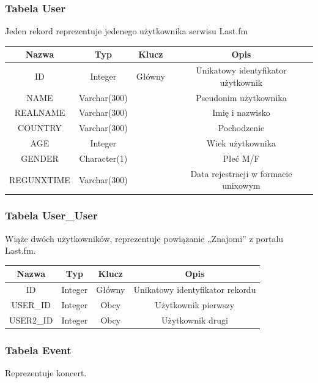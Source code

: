 \documentclass[10pt,a4paper,epic,carom]{article}
\begin{document}
\subsubsection{Tabela User}
Jeden rekord reprezentuje jedenego użytkownika serwisu Last.fm

\begin{table}[H]
  \centering
    \begin{tabular}{cccc}
    \addlinespace
    \toprule
    Nazwa & Typ   & Klucz & Opis \\
    \midrule
    ID    & Integer & Główny & Unikatowy identyfikator użytkownik \\
    NAME  & Varchar(300) &       & Pseudonim użytkownika \\
    REALNAME & Varchar(300) &       & Imię i nazwisko \\
    COUNTRY & Varchar(300) &       & Pochodzenie \\
    AGE   & Integer &       & Wiek użytkownika \\
    GENDER & Character(1) &       & Płeć M/F \\
    REGUNXTIME & Varchar(300) &       & Data rejestracji w formacie unixowym \\
    \bottomrule
    \end{tabular}
  \label{tab:addlabel}
\end{table}

\subsubsection {Tabela User\_User}
Wiąże dwóch użytkowników, reprezentuje powiązanie „Znajomi” z portalu Last.fm.

\begin{table}[H]
  \centering
    \begin{tabular}{cccc}
    \addlinespace
    \toprule
    Nazwa & Typ   & Klucz & Opis \\
    \midrule
    ID    & Integer & Główny & Unikatowy identyfikator rekordu \\
    USER\_ID & Integer & Obcy  & Użytkownik pierwszy \\
    USER2\_ID & Integer & Obcy  & Użytkownik drugi \\
    \bottomrule
    \end{tabular}
  \label{tab:addlabel}
\end{table}

\subsubsection {Tabela Event}
Reprezentuje koncert.
\end{document}

